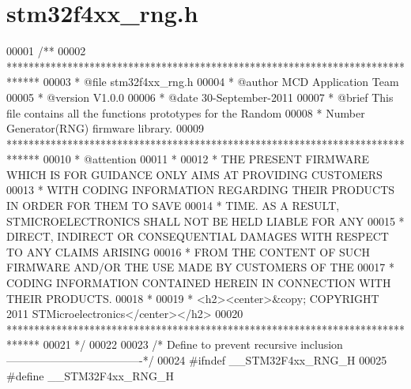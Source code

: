 \section{stm32f4xx\+\_\+rng.\+h}
\label{stm32f4xx__rng_8h_source}

\begin{DoxyCode}
00001 \textcolor{comment}{/**}
00002 \textcolor{comment}{  ******************************************************************************}
00003 \textcolor{comment}{  * @file    stm32f4xx\_rng.h}
00004 \textcolor{comment}{  * @author  MCD Application Team}
00005 \textcolor{comment}{  * @version V1.0.0}
00006 \textcolor{comment}{  * @date    30-September-2011}
00007 \textcolor{comment}{  * @brief   This file contains all the functions prototypes for the Random }
00008 \textcolor{comment}{  *          Number Generator(RNG) firmware library.}
00009 \textcolor{comment}{  ******************************************************************************}
00010 \textcolor{comment}{  * @attention}
00011 \textcolor{comment}{  *}
00012 \textcolor{comment}{  * THE PRESENT FIRMWARE WHICH IS FOR GUIDANCE ONLY AIMS AT PROVIDING CUSTOMERS}
00013 \textcolor{comment}{  * WITH CODING INFORMATION REGARDING THEIR PRODUCTS IN ORDER FOR THEM TO SAVE}
00014 \textcolor{comment}{  * TIME. AS A RESULT, STMICROELECTRONICS SHALL NOT BE HELD LIABLE FOR ANY}
00015 \textcolor{comment}{  * DIRECT, INDIRECT OR CONSEQUENTIAL DAMAGES WITH RESPECT TO ANY CLAIMS ARISING}
00016 \textcolor{comment}{  * FROM THE CONTENT OF SUCH FIRMWARE AND/OR THE USE MADE BY CUSTOMERS OF THE}
00017 \textcolor{comment}{  * CODING INFORMATION CONTAINED HEREIN IN CONNECTION WITH THEIR PRODUCTS.}
00018 \textcolor{comment}{  *}
00019 \textcolor{comment}{  * <h2><center>&copy; COPYRIGHT 2011 STMicroelectronics</center></h2>}
00020 \textcolor{comment}{  ******************************************************************************}
00021 \textcolor{comment}{  */}
00022 
00023 \textcolor{comment}{/* Define to prevent recursive inclusion -------------------------------------*/}
00024 \textcolor{preprocessor}{#}\textcolor{preprocessor}{ifndef} \textcolor{preprocessor}{\_\_STM32F4xx\_RNG\_H}
00025 \textcolor{preprocessor}{#}\textcolor{preprocessor}{define} \textcolor{preprocessor}{\_\_STM32F4xx\_RNG\_H}

\end{DoxyCode}
